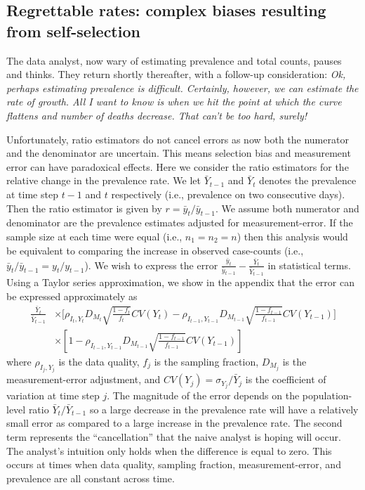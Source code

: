 \documentclass[aoas]{amsart}
\begin{document}
\subsection{Regrettable rates: complex biases resulting from self-selection}
\label{section:rates}

The data analyst, now wary of estimating prevalence and total counts, pauses and thinks.  They return shortly thereafter, with a follow-up consideration: \emph{Ok, perhaps estimating prevalence is difficult. Certainly, however, we can estimate the rate of growth.  All I want to know is when we hit the point at which the curve flattens and number of deaths decrease.  That can't be too hard, surely!}

Unfortunately, ratio estimators do not cancel errors as now both the numerator and the denominator are uncertain.  This means selection bias and measurement error can have paradoxical effects.  Here we consider the ratio estimators for the relative change in the prevalence rate.  We let $\bar Y_{t-1}$ and $\bar Y_{t}$ denotes the prevalence at time step $t-1$ and $t$ respectively (i.e., prevalence on two consecutive days).  Then the ratio estimator is given by $r = \bar y_t / \bar y_{t-1}$.  We assume both numerator and denominator are the prevalence estimates adjusted for measurement-error. If the sample size at each time were equal (i.e., $n_1 = n_2 = n$) then this analysis would be equivalent to comparing the increase in observed case-counts (i.e., $\bar y_t/\bar y_{t-1} = y_t/y_{t-1}$).  We wish to express the error $\frac{\bar y_t}{\bar y_{t-1}} - \frac{\bar Y_{t}}{\bar Y_{t-1}}$ in statistical terms.  Using a Taylor series approximation, we show in the appendix that the error can be expressed approximately as
$$
\begin{aligned}
\frac{\bar Y_t}{\bar Y_{t-1}} &\times \bigg[ \rho_{I_t,Y_t} D_{M_t} \sqrt{\frac{1-f_t}{f_t}} CV (Y_t)  -\rho_{I_{t-1},Y_{t-1}} D_{M_{t-1}} \sqrt{\frac{1-f_{t-1}}{f_{t-1}}} CV (Y_{t-1}) \bigg] \\
&\times \left[ 1 - \rho_{I_{t-1},Y_{t-1}} D_{M_{t-1}} \sqrt{\frac{1-f_{t-1}}{f_{t-1}}} CV (Y_{t-1}) \right]
\end{aligned}
$$
where $\rho_{I_j, Y_j}$ is the data quality, $f_j$ is the sampling fraction, $D_{M_j}$ is the measurement-error adjustment, and $CV(Y_j) = \sigma_{Y_j}/\bar Y_j$ is the coefficient of variation at time step $j$.  The magnitude of the error depends on the population-level ratio $\bar Y_{t} / \bar Y_{t-1}$ so a large decrease in the prevalence rate will have a relatively small error as compared to a large increase in the prevalence rate. The second term represents the ``cancellation'' that the naive analyst is hoping will occur.  The analyst's intuition only holds when the difference is equal to zero.  This occurs at times when data quality, sampling fraction, measurement-error, and prevalence are all constant across time.
\end{document}

